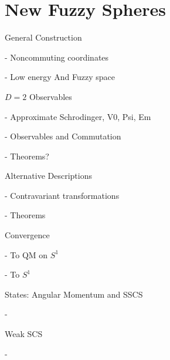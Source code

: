 \section{New Fuzzy Spheres}

\begin{frame}{General Construction} %

    - Noncommuting coordinates
    
    - Low energy And Fuzzy space
    
\end{frame}

\begin{frame}{$D = 2$ Observables} %

    - Approximate Schrodinger, V0, Psi, Em
    
    - Observables and Commutation
    
    - Theorems?

\end{frame}

\begin{frame}{Alternative Descriptions} %

     - Contravariant transformations
     
     - Theorems
    
\end{frame}

\begin{frame}{Convergence} %

    - To QM on $S^1$
    
    - To $S^1$
    
\end{frame}

\begin{frame}{States: Angular Momentum and SSCS} %

    - \iff
    
\end{frame}

\begin{frame}{Weak SCS} %

    - 
    
\end{frame}